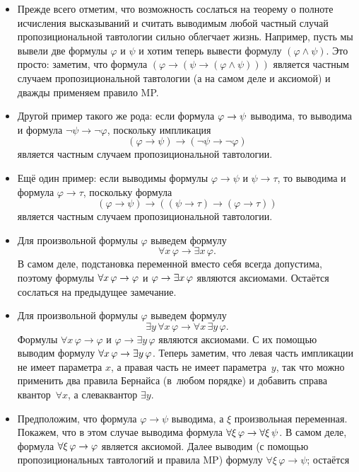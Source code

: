 \begin{itemize}
        \item
Прежде всего отметим, что возможность сослаться на теорему о
полноте исчисления высказываний и считать выводимым любой
частный случай пропозициональной тавтологии сильно облегчает
жизнь. Например, пусть мы вывели две формулы $\varphi$ и $\psi$
и хотим теперь вывести формулу $(\varphi\land\psi)$. Это просто:
заметим, что формула $(\varphi\to(\psi\to(\varphi\land\psi)))$
является частным случаем пропозициональной тавтологии (а на
самом деле и аксиомой) и дважды применяем правило MP.
        \item
Другой пример такого же рода: если формула $\varphi\hm\to\psi$ выводима,
то выводима и формула $\lnot\psi\to\lnot\varphi$, поскольку импликация
$$(\varphi\to\psi)\to(\lnot\psi\to\lnot\varphi)$$ является частным
случаем пропозициональной тавтологии.
        \item
Ещё один пример: если выводимы формулы $\varphi\to\psi$ и $\psi\to\tau$,
то выводима и формула $\varphi\to\tau$, поскольку формула
        $$
(\varphi\to\psi) \to ((\psi\to\tau)\to(\varphi\to\tau))
        $$
является частным случаем пропозициональной тавтологии.
        \item
Для произвольной формулы $\varphi$ выведем формулу
        $$
\forall x \, \varphi \to \exists x \, \varphi.
        $$
В самом деле, подстановка переменной вместо себя
всегда допустима, поэтому формулы $\forall x\,\varphi \hm\to
\varphi$ и $\varphi\hm\to\exists x\,\varphi$ являются аксиомами. Остаётся сослаться на предыдущее замечание.
        \item
Для произвольной формулы $\varphi$ выведем формулу
        $$
\exists y\, \forall x\, \varphi \to
\forall x\, \exists y\, \varphi.
        $$
Формулы $\forall x\,\varphi \to \varphi$ и $\varphi\to\exists
y\,\varphi$ являются аксиомами. С их помощью выводим
формулу $\forall x\, \varphi\hm\to \exists
y\,\varphi$. Теперь заметим, что левая часть импликации не имеет
параметра $x$, а правая часть не имеет параметра~$y$, так что
можно применить два правила Бернайса (в~любом порядке) и
добавить справа квантор~$\forall x$, а слева\т квантор $\exists
y$.
        \item
Предположим, что формула $\varphi\to\psi$ выводима, а $\xi$\т
произвольная переменная. Покажем, что в этом случае выводима
формула $\forall \xi\,\varphi\hm\to \forall\xi\,\psi$. В самом
деле, формула $\forall \xi\,\varphi\hm\to\varphi$ является
аксиомой. Далее выводим (с помощью пропозициональных тавтологий
и правила MP) формулу $\forall \xi\,\varphi \to\psi$; остаётся

\end{itemize}
